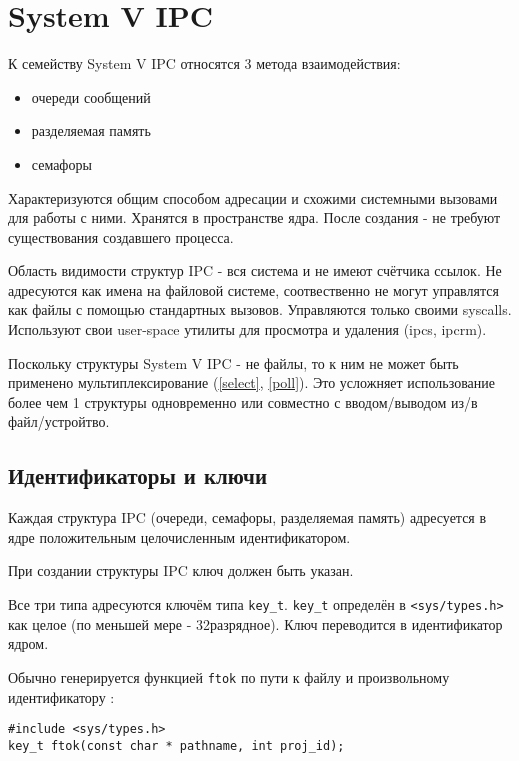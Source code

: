 \chapter{System V IPC}

К семейству System V IPC относятся 3 метода взаимодействия:
\begin{itemize}
\item очереди сообщений
\item разделяемая память
\item семафоры
\end{itemize}

Характеризуются общим способом адресации и схожими системными вызовами для работы с ними.
Хранятся в пространстве ядра. После создания - не требуют существования создавшего процесса.

Область видимости структур IPC - вся система и не имеют счётчика ссылок. Не адресуются как имена на файловой системе, соотвественно не могут управлятся как файлы с помощью стандартных вызовов. Управляются только своими syscalls. Используют свои user-space утилиты для просмотра и удаления (ipcs, ipcrm).

Поскольку структуры System V IPC - не файлы, то к ним не может быть применено  мультиплексирование (\ref{select}, \ref{poll}). Это усложняет использование более чем 1 структуры одновременно или совместно с вводом/выводом из/в файл/устройтво. 

\section{Идентификаторы и ключи}

Каждая структура IPC (очереди, семафоры, разделяемая память) адресуется в ядре положительным целочисленным идентификатором. 

При создании структуры IPC ключ должен быть указан. 

Все три типа адресуются ключём типа \verb+key_t+. \verb+key_t+ определён в \verb+<sys/types.h>+ как целое (по меньшей мере - 32разрядное). Ключ переводится в идентификатор ядром.

Обычно генерируется функцией \verb+ftok+ по пути к файлу и произвольному идентификатору :
\begin{verbatim}
#include <sys/types.h>
key_t ftok(const char * pathname, int proj_id);
\end{verbatim}

